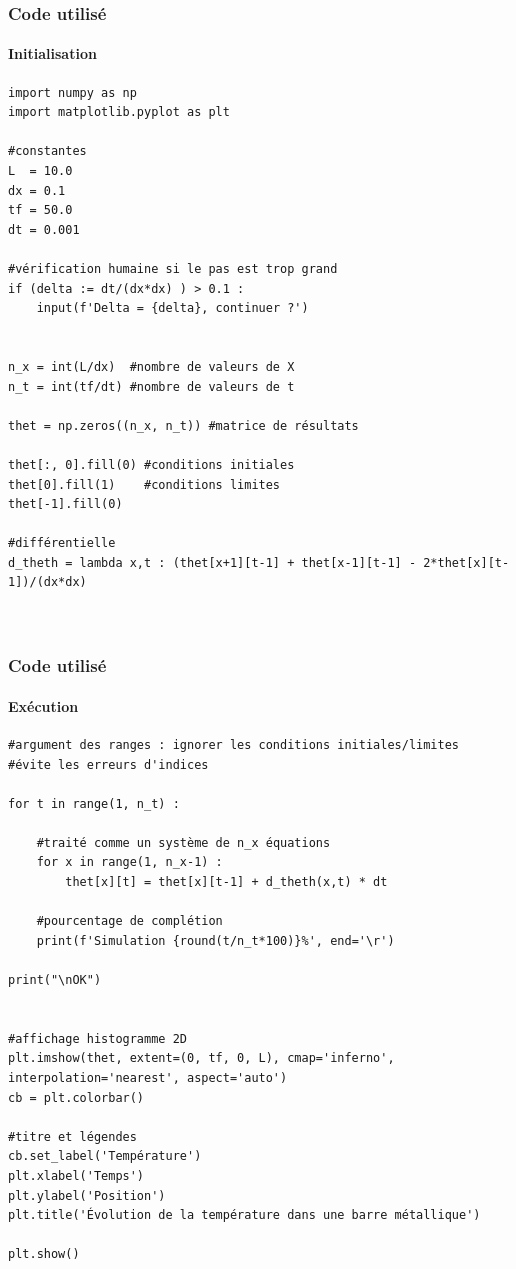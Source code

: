 \documentclass{beamer}
\begin{document}
	\begin{frame}[fragile]
    \frametitle{Code utilisé}
    \framesubtitle{Initialisation}

\begin{verbatim}
import numpy as np
import matplotlib.pyplot as plt

#constantes
L  = 10.0
dx = 0.1
tf = 50.0
dt = 0.001

#vérification humaine si le pas est trop grand
if (delta := dt/(dx*dx) ) > 0.1 :
    input(f'Delta = {delta}, continuer ?')


n_x = int(L/dx)  #nombre de valeurs de X
n_t = int(tf/dt) #nombre de valeurs de t

thet = np.zeros((n_x, n_t)) #matrice de résultats

thet[:, 0].fill(0) #conditions initiales
thet[0].fill(1)    #conditions limites
thet[-1].fill(0)

#différentielle
d_theth = lambda x,t : (thet[x+1][t-1] + thet[x-1][t-1] - 2*thet[x][t-1])/(dx*dx)

  
\end{verbatim}


    \end{frame}



    \begin{frame}[fragile]
    \frametitle{Code utilisé}
    \framesubtitle{Exécution}

\begin{verbatim}
#argument des ranges : ignorer les conditions initiales/limites
#évite les erreurs d'indices

for t in range(1, n_t) :

    #traité comme un système de n_x équations
    for x in range(1, n_x-1) :
        thet[x][t] = thet[x][t-1] + d_theth(x,t) * dt

    #pourcentage de complétion
    print(f'Simulation {round(t/n_t*100)}%', end='\r')

print("\nOK")


#affichage histogramme 2D
plt.imshow(thet, extent=(0, tf, 0, L), cmap='inferno', interpolation='nearest', aspect='auto')
cb = plt.colorbar()

#titre et légendes
cb.set_label('Température')
plt.xlabel('Temps')
plt.ylabel('Position')
plt.title('Évolution de la température dans une barre métallique')

plt.show()
\end{verbatim}


    \end{frame}
\end{document}
